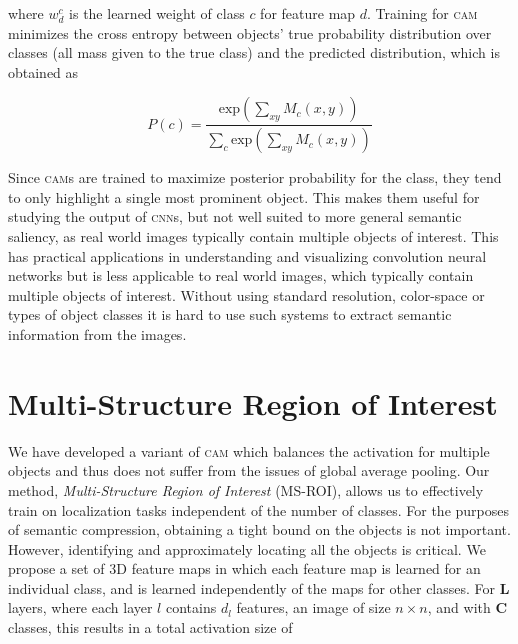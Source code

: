{\setlength{\parindent}{0cm} where $ w^{c}_{d} $ is the learned weight of class $c$ for feature map $d$.
Training for \textsc{cam} minimizes the cross entropy between objects' true probability distribution over classes (all mass given to the true class) and the predicted distribution, which is obtained as }

\begin{equation}
    P(c) = \frac{\text{exp}(\sum_{xy}{M_c(x,y)})}{\sum_c \text{exp}(\sum_{xy}{M_c(x,y)})}
    \label{eqn_posterior}
\end{equation}

Since \textsc{cam}s are trained to maximize posterior probability for the class, they tend to only highlight a single most prominent object.
This makes them useful for studying the output of \textsc{cnn}s, but not well suited to more general semantic saliency, as real world images  typically contain multiple objects of interest.
This has practical applications in understanding and visualizing convolution neural networks but is less applicable to real world images, which typically contain multiple objects of interest.
Without using standard resolution, color-space or types of object classes it is hard to use such systems to extract semantic information from the images.

\section{Multi-Structure Region of Interest}
We have developed a variant of \textsc{cam} which balances the activation for multiple objects and thus does not suffer from the issues of global average pooling.
Our method, \textit{Multi-Structure Region of Interest} (MS-ROI), allows us to effectively train on localization tasks independent of the number of classes.
For the purposes of semantic compression, obtaining a tight bound on the objects is not important. However, identifying and approximately locating all the objects is critical.
We propose a set of 3D feature maps in which each feature map is learned for an individual class, and is learned independently of the maps for other classes.
For $ \mathbf{L} $ layers, where each layer $l$ contains $d_l$ features, an image of size $ n \times n $, and with $\mathbf{C}$ classes, this results in a total activation size of

